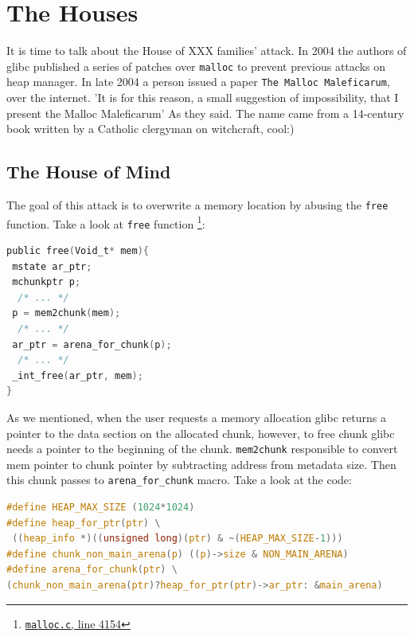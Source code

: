 \documentclass{masterthesis}
\newcommand*\libc{glibc}
\newcommand*\mallocc{\lstinline{malloc}}
\newcommand*\freec{\lstinline{free}}
\begin{document}
\section{The Houses}

It is time to talk about the House of XXX families' attack. In 2004 the authors of \libc{} published a series of patches over \mallocc{} to prevent previous attacks on heap manager. In late 2004 a person issued a paper \lstinline{The Malloc Maleficarum}, over the internet. 'It is for this reason, a small suggestion of impossibility, that I present the Malloc Maleficarum' As they said. The name came from a 14-century book written by a Catholic clergyman on witchcraft, cool:)

\subsection{The House of Mind}
The goal of this attack is to overwrite a memory location by abusing the \freec{} function. Take a look at \freec{} function \footnote{\href{https://sourceware.org/git/?p=glibc.git;a=blob;f=malloc/malloc.c;h=f7cd29bc2f93e1082ee77800bd64a4b2a2897055;hb=9ea3686266dca3f004ba874745a4087a89682617\#l4154}{\texttt{malloc.c}, line 4154}}:
\begin{lstlisting}[language=c,frame=tlrb]
public free(Void_t* mem){
 mstate ar_ptr;
 mchunkptr p;
  /* ... */
 p = mem2chunk(mem);
  /* ... */
 ar_ptr = arena_for_chunk(p);
  /* ... */
 _int_free(ar_ptr, mem);
}
 \end{lstlisting}
As we mentioned, when the user requests a memory allocation \libc{} returns a pointer to the data section on the allocated chunk, however, to free chunk \libc{} needs a pointer to the beginning of the chunk. \lstinline{mem2chunk} responsible to convert mem pointer to chunk pointer by subtracting address from metadata size. Then this chunk passes to \lstinline{arena_for_chunk} macro. Take a look at the code:

\begin{lstlisting}[language=c,frame=tlrb]
#define HEAP_MAX_SIZE (1024*1024)
#define heap_for_ptr(ptr) \
 ((heap_info *)((unsigned long)(ptr) & ~(HEAP_MAX_SIZE-1)))
#define chunk_non_main_arena(p) ((p)->size & NON_MAIN_ARENA)
#define arena_for_chunk(ptr) \
(chunk_non_main_arena(ptr)?heap_for_ptr(ptr)->ar_ptr: &main_arena)
 \end{lstlisting}
\end{document}
